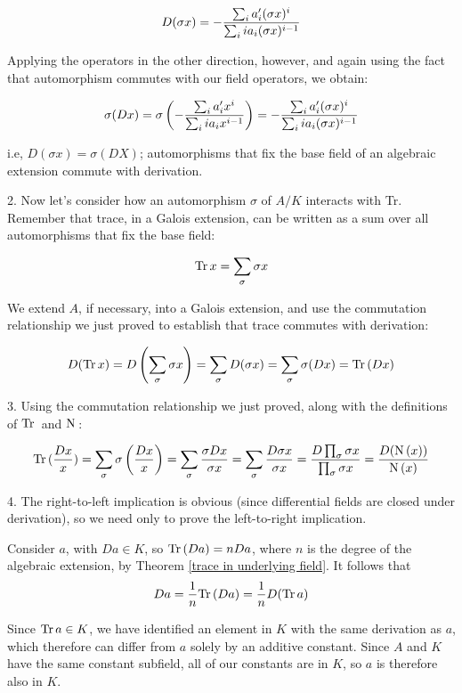 $$D(\sigma x) = - {\sum_i a_i' (\sigma x)^i \over {\sum_i i a_i (\sigma x)^{i-1}}} $$

Applying the operators in the other direction, however, and again using
the fact that automorphism commutes with our field operators, we obtain:

$$\sigma(D x) = \sigma\left(- {\sum_i a_i' x^i \over {\sum_i i a_i x^{i-1}}} \right)
= - {\sum_i a_i' (\sigma x)^i \over {\sum_i i a_i (\sigma x)^{i-1}}} $$

i.e, $D(\sigma x) = \sigma(D X)$; automorphisms that fix the base field
of an algebraic extension commute with derivation.

2. Now let's consider how an automorphism $\sigma$ of $A/K$ interacts with Tr.  Remember that
trace, in a Galois extension, can be written as a sum over all
automorphisms that fix the base field:

$${\rm Tr\,} x = \sum_\sigma \sigma x$$

We extend $A$, if necessary, into a Galois extension, and use
the commutation relationship we just proved to establish
that trace commutes with derivation:

$$D({\rm Tr\,} x) = D\left(\sum_\sigma \sigma x\right) = \sum_\sigma D(\sigma x)
= \sum_\sigma \sigma(D x) = {\rm Tr\,}(D x)$$

3. Using the commutation relationship we just proved, along with the definitions of ${\rm Tr\,}$ and ${\rm N\,}$:

$${\rm Tr\,}(\frac{D x}{x}) = \sum_\sigma \sigma\left( \frac{D x}{x} \right) = \sum_\sigma \frac{\sigma D x}{\sigma x}
= \sum_\sigma \frac{D \sigma x}{\sigma x} = \frac{D \prod_\sigma \sigma x}{\prod_\sigma \sigma x} = \frac{D({\rm N\,}(x))}{{\rm N\,}(x)}$$

4. The right-to-left implication is obvious (since differential fields
are closed under derivation), so we need only to prove the
left-to-right implication.

Consider $a$, with $D a \in K$,
so ${\rm Tr\,}(D a) = n D a$, where $n$ is the degree of the algebraic extension,
by Theorem \ref{trace in underlying field}.
It follows that
$$D a = \frac{1}{n} {\rm Tr\,}(D a) = \frac{1}{n} D({\rm Tr\,} a)$$

Since ${\rm Tr\,} a \in K$, we have identified an
element in $K$ with the same derivation as $a$, which therefore can
differ from $a$ solely by an additive constant.  Since $A$ and $K$ have the same
constant subfield, all of our constants are in $K$, so $a$ is
therefore also in $K$.

\endtheorem

\example

